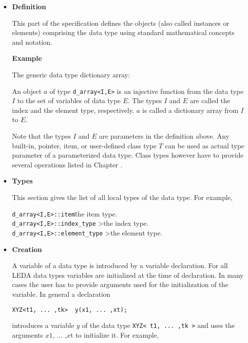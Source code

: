 \begin{itemize}
\item{\bf Definition}

\smallskip
This part of the specification defines the objects (also called instances or
elements) comprising the data type using standard mathematical concepts and 
notation. 

{\bf Example}

The generic data type dictionary array:

An object $a$ of type \texttt{d\_array<I,E>} is an injective function from
the data type $I$ to the set of variables of data type $E$. The types $I$ and
$E$ are called the index and the element type, respectively. $a$ is called a
dictionary array from $I$ to $E$.

Note that the types $I$ and $E$ are parameters in the definition above.
Any built-in, pointer, item, or user-defined class type $T$ can be used 
as actual type parameter of a parameterized data type. Class types however 
have to provide several operations listed in Chapter 
.


\item {\bf Types}

This section gives the list of all local types of the data type. For example,
\begin{tabbing}
{\tt d\_array<I,E>::item}\hspace{2.5cm}\=the item type.\\
{\tt d\_array<I,E>::index\_type}       >the index type.\\
{\tt d\_array<I,E>::element\_type}     >the element type.\\
\end{tabbing}



\item {\bf Creation}

A variable of a data type is introduced by a \CC{} variable declaration. 
For all LEDA data types variables are initialized at the time of declaration. 
In many cases the user has to provide arguments used for the initialization 
of the variable.  In general a declaration

\begin{verbatim}
XYZ<t1, ... ,tk>  y(x1, ... ,xt);
\end{verbatim}

introduces a variable $y$ of the data type \texttt{XYZ< t1, ... ,tk
>} and uses the arguments $x1$, ... ,$x$t to initialize it. For example,


\end{itemize}
